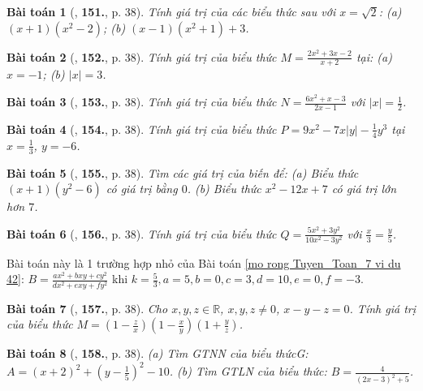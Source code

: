\documentclass{article}
\numberwithin{equation}{section}
\newtheorem{baitoan}{Bài toán}
\begin{document}
\begin{baitoan}[\cite{Tuyen_Toan_7}, \textbf{151.}, p. 38]
	Tính giá trị của các biểu thức sau với $x = \sqrt{2}$: (a) $(x + 1)(x^2 - 2)$; (b) $(x - 1)(x^2 + 1) + 3$.
\end{baitoan}

\begin{baitoan}[\cite{Tuyen_Toan_7}, \textbf{152.}, p. 38]
	Tính giá trị của biểu thức $M = \frac{2x^2 + 3x - 2}{x + 2}$ tại: (a) $x = -1$; (b) $|x| = 3$.
\end{baitoan}

\begin{baitoan}[\cite{Tuyen_Toan_7}, \textbf{153.}, p. 38]
	Tính giá trị của biểu thức $N = \frac{6x^2 + x - 3}{2x - 1}$ với $|x| = \frac{1}{2}$.
\end{baitoan}

\begin{baitoan}[\cite{Tuyen_Toan_7}, \textbf{154.}, p. 38]
	Tính giá trị của biểu thức $P = 9x^2 - 7x|y| - \frac{1}{4}y^3$ tại $x = \frac{1}{3}$, $y = -6$.
\end{baitoan}

\begin{baitoan}[\cite{Tuyen_Toan_7}, \textbf{155.}, p. 38]
	Tìm các giá trị của biến để: (a) Biểu thức $(x + 1)(y^2 - 6)$ có giá trị bằng $0$. (b) Biểu thức $x^2 - 12x + 7$ có giá trị lớn hơn $7$.
\end{baitoan}

\begin{baitoan}[\cite{Tuyen_Toan_7}, \textbf{156.}, p. 38]
	Tính giá trị của biểu thức $Q = \frac{5x^2 + 3y^2}{10x^2 - 3y^2}$ với $\frac{x}{3} = \frac{y}{5}$.
\end{baitoan}
Bài toán này là 1 trường hợp nhỏ của Bài toán \ref{mo rong Tuyen_Toan_7 vi du 42}: $B = \frac{ax^2 + bxy + cy^2}{dx^2 + exy + fy^2}$ khi $k = \frac{5}{3}, a = 5, b = 0, c = 3, d = 10, e = 0, f = -3$.

\begin{baitoan}[\cite{Tuyen_Toan_7}, \textbf{157.}, p. 38]
	Cho $x,y,z\in\mathbb{R}$, $x,y,z\ne0$, $x - y - z = 0$. Tính giá trị của biểu thức $M = \left(1 - \frac{z}{x}\right)\left(1 - \frac{x}{y}\right)\left(1 + \frac{y}{z}\right)$.
\end{baitoan}

\begin{baitoan}[\cite{Tuyen_Toan_7}, \textbf{158.}, p. 38]
	(a) Tìm GTNN của biểu thứcG: $A = (x + 2)^2 + \left(y - \frac{1}{5}\right)^2 - 10$. (b) Tìm GTLN của biểu thức: $B = \frac{4}{(2x - 3)^2 + 5}$.
\end{baitoan}
\end{document}
